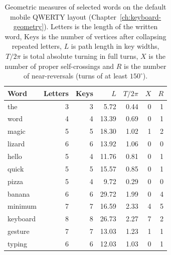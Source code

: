 \begin{table}[t]
\centering
\small
\begin{tabular}{lrrrrrr}
\toprule
Word & Letters & Keys & $L$ & $T/2\pi$ & $X$ & $R$ \\
\midrule
the & 3 & 3 & 5.72 & 0.44 & 0 & 1 \\
word & 4 & 4 & 13.39 & 0.69 & 0 & 1 \\
magic & 5 & 5 & 18.30 & 1.02 & 1 & 2 \\
lizard & 6 & 6 & 13.92 & 1.06 & 0 & 0 \\
hello & 5 & 4 & 11.76 & 0.81 & 0 & 1 \\
quick & 5 & 5 & 15.57 & 0.85 & 0 & 1 \\
pizza & 5 & 4 & 9.72 & 0.29 & 0 & 0 \\
banana & 6 & 6 & 29.72 & 1.99 & 0 & 4 \\
minimum & 7 & 7 & 16.59 & 2.33 & 4 & 5 \\
keyboard & 8 & 8 & 26.73 & 2.27 & 7 & 2 \\
gesture & 7 & 7 & 13.03 & 1.23 & 1 & 1 \\
typing & 6 & 6 & 12.03 & 1.03 & 0 & 1 \\
\bottomrule
\end{tabular}
\caption{Geometric measures of selected words on the default mobile QWERTY layout (Chapter~\ref{ch:keyboard-geometry}). Letters is the length of the written word, Keys is the number of vertices after collapsing repeated letters, $L$ is path length in key widths, $T/2\pi$ is total absolute turning in full turns, $X$ is the number of proper self-crossings and $R$ is the number of near-reversals (turns of at least $150^\circ$).}
\label{tab:word-metrics}
\end{table}
